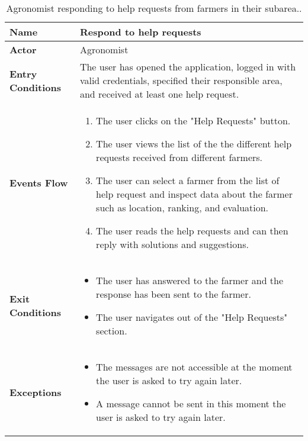 
\begin{table}[hbt!]
\centering
\small
\caption{\label{tab:agrRespondHelp}Agronomist responding to help requests from farmers in their subarea..}
\renewcommand{\arraystretch}{1.25}
\begin{tabular}{|l|>{\raggedright\arraybackslash}m{12cm}|}

    \hline
    \textbf{Name} & Respond to help requests\\
    \hline
   	\textbf{Actor} & Agronomist\\
    \hline
    \textbf{Entry Conditions} & The user has opened the application, logged in with valid credentials, specified their responsible area, and received at least one help request.\\
    \hline
    \textbf{Events Flow} & \begin{enumerate}
            \item The user clicks on the "Help Requests" button.
            \item The user views the list of the the different help requests received from different farmers.
            \item The user can select a farmer from the list of help request and inspect data about the farmer such as location, ranking, and evaluation.
            \item The user reads the help requests and can then reply with solutions and suggestions.
       \end{enumerate}\\
    \hline
    \textbf{Exit Conditions} & \begin{itemize}
    	\item The user has answered to the farmer and the response has been sent to the farmer.
    	\item The user navigates out of the "Help Requests" section.
    \end{itemize}\\
    \hline
    \textbf{Exceptions} & 
       \begin{itemize}
          \item The messages are not accessible at the moment the user is asked to try again later.
          \item A message cannot be sent in this moment the user is asked to try again later.
        \end{itemize}
     \\
    \hline
\end{tabular}
\end{table}